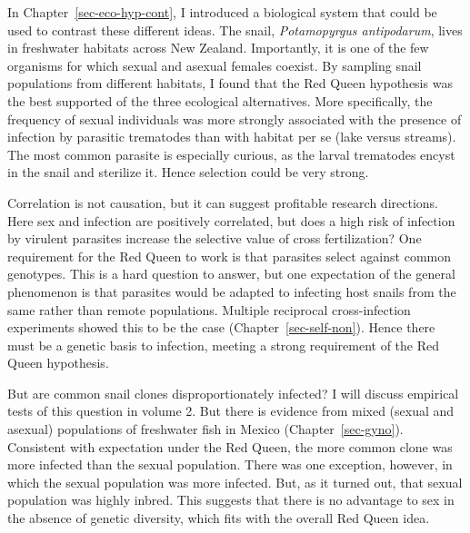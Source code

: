 \documentclass[
  letterpaper,
]{book}
\begin{document}
In Chapter~\ref{sec-eco-hyp-cont}, I introduced a biological system that
could be used to contrast these different ideas. The snail,
\emph{Potamopyrgus antipodarum}, lives in freshwater habitats across New
Zealand. Importantly, it is one of the few organisms for which sexual
and asexual females coexist. By sampling snail populations from
different habitats, I found that the Red Queen hypothesis was the best
supported of the three ecological alternatives. More specifically, the
frequency of sexual individuals was more strongly associated with the
presence of infection by parasitic trematodes than with habitat per se
(lake versus streams). The most common parasite is especially curious,
as the larval trematodes encyst in the snail and sterilize it. Hence
selection could be very strong.

Correlation is not causation, but it can suggest profitable research
directions. Here sex and infection are positively correlated, but does a
high risk of infection by virulent parasites increase the selective
value of cross fertilization? One requirement for the Red Queen to work
is that parasites select against common genotypes. This is a hard
question to answer, but one expectation of the general phenomenon is
that parasites would be adapted to infecting host snails from the same
rather than remote populations. Multiple reciprocal cross-infection
experiments showed this to be the case (Chapter~\ref{sec-self-non}).
Hence there must be a genetic basis to infection, meeting a strong
requirement of the Red Queen hypothesis.

But are common snail clones disproportionately infected? I will discuss
empirical tests of this question in volume 2. But there is evidence from
mixed (sexual and asexual) populations of freshwater fish in Mexico
(Chapter~\ref{sec-gyno}). Consistent with expectation under the Red
Queen, the more common clone was more infected than the sexual
population. There was one exception, however, in which the sexual
population was more infected. But, as it turned out, that sexual
population was highly inbred. This suggests that there is no advantage
to sex in the absence of genetic diversity, which fits with the overall
Red Queen idea.
\end{document}

